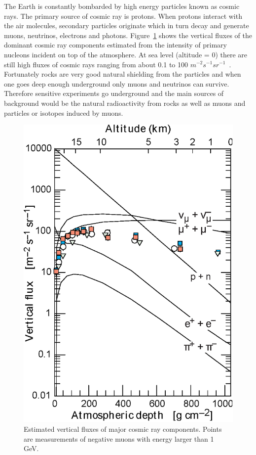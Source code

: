 The Earth is constantly bombarded by high energy particles known as cosmic rays. The primary source of cosmic ray is protons. When protons interact with the air molecules, secondary particles originate which in turn decay and generate muons, neutrinos, electrons and photons. Figure~\ref{figure:atmospheric_cosmic_rays} shows the vertical fluxes of the dominant cosmic ray components estimated from the intensity of primary nucleons incident on top of the atmosphere. At sea level (altitude = 0) there are still high fluxes of cosmic rays ranging from about 0.1 to 100 $m^{-2}s^{-1}sr^{-1}$~\cite{Olive2014}. Fortunately rocks are very good natural shielding from the particles and when one goes deep enough underground only muons and neutrinos can survive. Therefore sensitive experiments go underground and the main sources of background would be the natural radioactivity from rocks as well as muons and particles or isotopes induced by muons.
\begin{figure}
	\centering
	\includegraphics[width=.5\textwidth]{figures/chap2/atmospheric_cosmic_rays.eps}
	\caption[Estimated vertical fluxes of major cosmic ray components. Points are measurements of negative muons with energy larger than 1 GeV.]{Estimated vertical fluxes of major cosmic ray components. Points are measurements of negative muons with energy larger than 1 GeV.~\cite{Olive2014}}
	\label{figure:atmospheric_cosmic_rays}
\end{figure}

